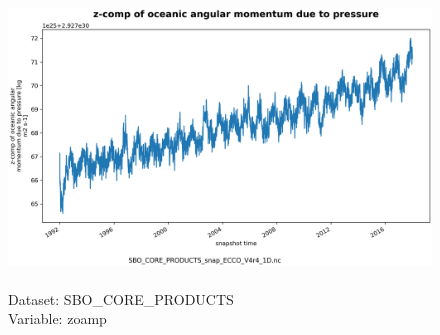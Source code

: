 \begin{figure}[H]
\centering
\includegraphics[scale=0.5]{../images/plots/oneD_plots/SBO_Core_Products/zoamp.png}
\caption{\\Dataset: SBO\_CORE\_PRODUCTS\\Variable: zoamp}
\label{tab:table-SBO_CORE_PRODUCTS_zoamp-Plot}
\end{figure}
\pagebreak

